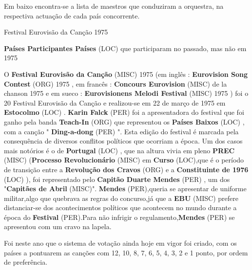 \documentclass[12pt,a4paper]{article}
\begin{document}
Em baixo encontra-se a lista de maestros que conduziram a orquestra, na respectiva actuação de cada país concorrente.



Festival Eurovisão da Canção 1975



\textbf{Países Participantes Países} (LOC) que participaram no passado, mas não em 1975

O \textbf{Festival Eurovisão da Canção} (MISC) 1975 (em inglês : \textbf{Eurovision Song Contest} (ORG) 1975 , em francês : \textbf{Concours Eurovision} (MISC) de la chanson 1975 e em sueco : \textbf{Eurovisionens Melodi Festival} (MISC) 1975 ) foi o 20 Festival Eurovisão da Canção e realizou-se em 22 de março de 1975 em \textbf{Estocolmo} (LOC) . \textbf{Karin Falck} (PER) foi a apresentadora do festival que foi ganho pela banda \textbf{Teach-In} (ORG) que representou os \textbf{Países Baixos} (LOC) , com a canção " \textbf{Ding-a-dong} (PER) ". Esta edição do festival é marcada pela consequência de diversos conflitos políticos que ocorriam a época. Um dos casos mais notórios é o de \textbf{Portugal} (LOC) , que na altura vivia em pleno \textbf{PREC} (MISC) (\textbf{Processo Revolucionário} (MISC) em \textbf{Curso} (LOC),que é o período de transição entre a \textbf{Revolução dos Cravos} (ORG) e a \textbf{Constituinte de 1976} (LOC) ), foi representado pelo \textbf{Capitão Duarte Mendes} (PER) , um dos "\textbf{Capitães de Abril} (MISC)". \textbf{Mendes} (PER),queria se apresentar de uniforme militar,algo que quebrava as regras do concurso,já que a \textbf{EBU} (MISC) prefere distanciar-se dos acontecimentos políticos que acontecem no mundo durante a época do \textbf{Festival} (PER).Para não infrigir o regulamento,\textbf{Mendes} (PER) se apresentou com um cravo na lapela.

Foi neste ano que o sistema de votação ainda hoje em vigor foi criado, com os países a pontuarem as canções com 12, 10, 8, 7, 6, 5, 4, 3, 2 e 1 ponto, por ordem de preferência.
\end{document}
